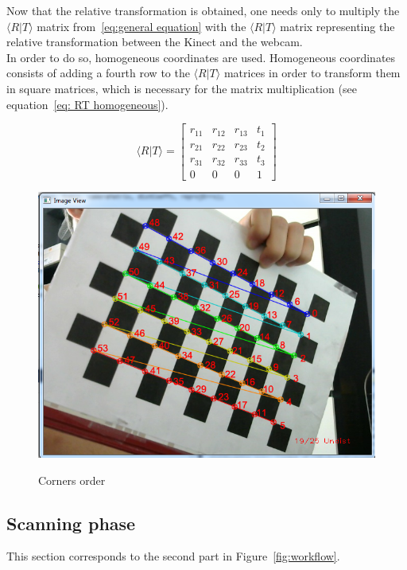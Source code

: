 Now that the relative transformation is obtained, one needs only to multiply the $\langle R\vert T\rangle$ matrix from~\ref{eq:general equation} with the $\langle R\vert T\rangle$ matrix representing the relative transformation between the Kinect and the webcam.\\

In order to do so, homogeneous coordinates are used. Homogeneous coordinates consists of adding a fourth row to the $\langle R\vert T\rangle$ matrices in order to transform them in square matrices, which is necessary for the matrix multiplication (see equation~\ref{eq: RT homogeneous}).

\begin{equation}
\label{eq: RT homogeneous}
  \langle R\vert T\rangle =  \begin{bmatrix}
       r_{11} & r_{12} & r_{13} & t_1 \\
       r_{21} & r_{22} & r_{23} & t_2 \\
       r_{31} & r_{32} & r_{33} & t_3 \\
       0 & 0 & 0 & 1
     \end{bmatrix}
\end{equation}

\begin{figure}[H]
\caption{Corners order}
\centering
    \includegraphics[width=1.0\textwidth]{images/cornersOrder.png}
\label{fig:corners order}
\end{figure}

\subsection{Scanning phase} 
\label{sec:Scanning phase}
This section corresponds to the second part in Figure~\ref{fig:workflow}.\\


